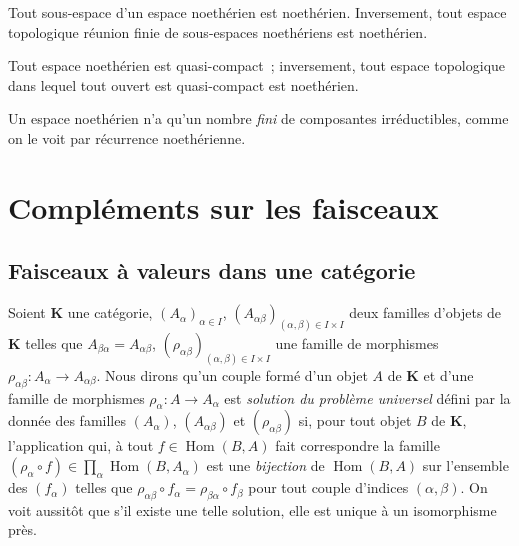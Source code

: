 \begin{env}[2.2.3]
\label{0.2.2.3-fr}
Tout sous-espace d'un espace noethérien est noethérien. Inversement, tout
espace topologique réunion finie de sous-espaces noethériens est noethérien.
\end{env}

\begin{env}[2.2.4]
\label{0.2.2.4-fr}
Tout espace noethérien est quasi-compact~; inversement, tout espace topologique
dans lequel tout ouvert est quasi-compact est noethérien.
\end{env}

\begin{env}[2.2.5]
\label{0.2.2.5-fr}
Un espace noethérien n'a qu'un nombre \emph{fini} de composantes
irréductibles, comme on le voit par récurrence noethérienne.
\end{env}

\section{Compléments sur les faisceaux}
\label{section:0.3-fr}

\subsection{Faisceaux à valeurs dans une catégorie}
\label{subsection:0.3.1-fr}

\begin{env}[3.1.1]
\label{0.3.1.1-fr}
Soient $\mathbf{K}$ une catégorie, $(A_\alpha)_{\alpha\in I}$,
$(A_{\alpha\beta})_{(\alpha,\beta)\in I\times I}$ deux familles d'objets de
$\mathbf{K}$ telles que $A_{\beta\alpha}=A_{\alpha\beta}$,
$(\rho_{\alpha\beta})_{(\alpha,\beta)\in I\times I}$ une famille de morphismes
$\rho_{\alpha\beta}:A_\alpha\to A_{\alpha\beta}$. Nous dirons qu'un couple
formé d'un objet $A$ de $\mathbf{K}$ et d'une famille de morphismes
$\rho_\alpha:A\to A_\alpha$ est \emph{solution du problème universel} défini
par la donnée des familles $(A_\alpha)$, $(A_{\alpha\beta})$ et
$(\rho_{\alpha\beta})$ si, pour tout objet $B$ de $\mathbf{K}$, l'application
qui, à tout $f\in\operatorname{Hom}(B,A)$ fait correspondre la famille
$(\rho_\alpha\circ f)\in\prod_\alpha\operatorname{Hom}(B,A_\alpha)$ est une
\emph{bijection} de $\operatorname{Hom}(B,A)$ sur l'ensemble des $(f_\alpha)$
telles que
$\rho_{\alpha\beta}\circ f_\alpha=\rho_{\beta\alpha}\circ f_\beta$ pour tout
couple d'indices $(\alpha,\beta)$. On voit aussitôt que s'il existe une telle
solution, elle est unique à un isomorphisme près.
\end{env}

